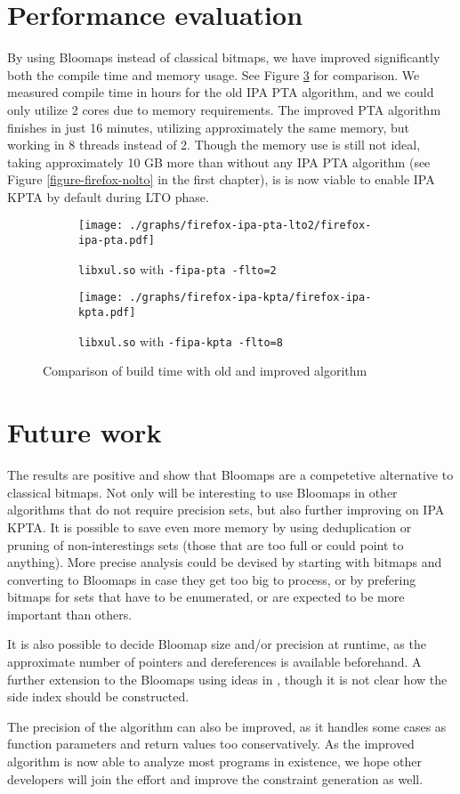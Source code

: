 \section{Performance evaluation}

By using Bloomaps instead of classical bitmaps, we have improved significantly
both the compile time and memory usage. See Figure
\ref{figure-new-old-comparison} for comparison. We measured compile time in
hours for the old IPA PTA algorithm, and we could only utilize 2 cores due to
memory requirements. The improved PTA algorithm finishes in just 16 minutes,
utilizing approximately the same memory, but working in 8 threads instead of 2.
Though the memory use is still not ideal, taking approximately 10 GB more than
without any IPA PTA algorithm (see Figure \ref{figure-firefox-nolto} in the
first chapter), is is now viable to enable IPA KPTA by default during LTO
phase.

\begin{figure}[!ht]
\begin{subfigure}[b]{\textwidth}
	\centering
	\texttt{[image: ./graphs/firefox-ipa-pta-lto2/firefox-ipa-pta.pdf]}
	\caption{{\tt libxul.so} with {\tt -fipa-pta -flto=2}}
	\label{figure-firefox-ipa-pta-lto2-2}
\end{subfigure}
\begin{subfigure}[b]{\textwidth}
	\centering
	\texttt{[image: ./graphs/firefox-ipa-kpta/firefox-ipa-kpta.pdf]}
	\caption{{\tt libxul.so} with {\tt -fipa-kpta -flto=8}}
	\label{figure-firefox-ipa-kpta}
\end{subfigure}
\caption{Comparison of build time with old and improved algorithm}
	\label{figure-new-old-comparison}
\end{figure}

\section{Future work}

The results are positive and show that Bloomaps are a competetive alternative
to classical bitmaps. Not only will be interesting to use Bloomaps in other
algorithms that do not require precision sets, but also further improving on IPA
KPTA. It is possible to save even more memory by using deduplication or pruning
of non-interestings sets (those that are too full or could point to anything).
More precise analysis could be devised by starting with bitmaps and converting
to Bloomaps in case they get too big to process, or by prefering bitmaps for
sets that have to be enumerated, or are expected to be more important than others.

It is also possible to decide Bloomap size and/or precision at runtime, as the
approximate number of pointers and dereferences is available beforehand. A
further extension to the Bloomaps using ideas in \cite{Guo06thedynamic}, though it
is not clear how the side index should be constructed.

The precision of the algorithm can also be improved, as it handles some cases
as function parameters and return values too conservatively. As the improved
algorithm is now able to analyze most programs in existence, we hope other
developers will join the effort and improve the constraint generation as well.

